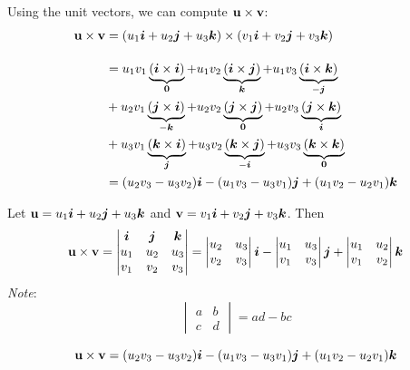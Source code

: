 \documentclass[../mathNotesPreamble]{subfiles}
\begin{document}
  \noindent
  Using the unit vectors, we can compute ${\mathbf{u}}\times{\mathbf{v}}$:
  \begin{align*}
    {\mathbf{u}}\times{\mathbf{v}}&= {\left(u_1{\bm{i}}+u_2{\bm{j}}+u_3{\bm{k}}\right)}\times{\left(v_1{\bm{i}}+v_2{\bm{j}}+v_3{\bm{k}}\right)}\\[0.75\baselineskip]
      &=u_1v_1\underbrace{{\left({\bm{i}}\times{\bm{i}}\right)}}_{\mathbf{0}}
       +u_1v_2\underbrace{{\left({\bm{i}}\times{\bm{j}}\right)}}_{{\bm{k}}}
       +u_1v_3\underbrace{{\left({\bm{i}}\times{\bm{k}}\right)}}_{-{\bm{j}}}\\
      &+u_2v_1\underbrace{{\left({\bm{j}}\times{\bm{i}}\right)}}_{-{\bm{k}}}
       +u_2v_2\underbrace{{\left({\bm{j}}\times{\bm{j}}\right)}}_{\mathbf{0}}
       +u_2v_3\underbrace{{\left({\bm{j}}\times{\bm{k}}\right)}}_{{\bm{i}}}\\
      &+u_3v_1\underbrace{{\left({\bm{k}}\times{\bm{i}}\right)}}_{{\bm{j}}}
       +u_3v_2\underbrace{{\left({\bm{k}}\times{\bm{j}}\right)}}_{-{\bm{i}}}
       +u_3v_3\underbrace{{\left({\bm{k}}\times{\bm{k}}\right)}}_{\mathbf{0}}\\
      &={\left(u_2v_3-u_3v_2\right)}{\bm{i}}
       -{\left(u_1v_3-u_3v_1\right)}{\bm{j}}
       +{\left(u_1v_2-u_2v_1\right)}{\bm{k}}
  \end{align*}
  \pagebreak

  \begin{thmBox*}
    Let ${\mathbf{u}}=u_1{\bm{i}}+u_2{\bm{j}}+u_3{\bm{k}}$ and ${\mathbf{v}}=v_1{\bm{i}}+v_2{\bm{j}}+v_3{\bm{k}}$. Then
    \[{\mathbf{u}}\times{\mathbf{v}}=
      \begin{vmatrix}
        {\bm{i}}& {\bm{j}}& {\bm{k}}\\
        u_1& u_2& u_3\\
        v_1& v_2& v_3
      \end{vmatrix}
      =\begin{vmatrix}
        u_2& u_3\\
        v_2& v_3
      \end{vmatrix}{\bm{i}}
      -\begin{vmatrix}
        u_1& u_3\\
        v_1& v_3
      \end{vmatrix}{\bm{j}}
      +\begin{vmatrix}
        u_1& u_2\\
        v_1& v_2
      \end{vmatrix}{\bm{k}}
    \]
    \textit{Note}:
      \[
      \begin{vmatrix}
        a&b\\c&d
      \end{vmatrix}
      =ad-bc
      \]
  \end{thmBox*}

  \[{\mathbf{u}}\times{\mathbf{v}}={\left(u_2v_3-u_3v_2\right)}{\bm{i}}
       -{\left(u_1v_3-u_3v_1\right)}{\bm{j}}
       +{\left(u_1v_2-u_2v_1\right)}{\bm{k}}\]
  
\end{document}
